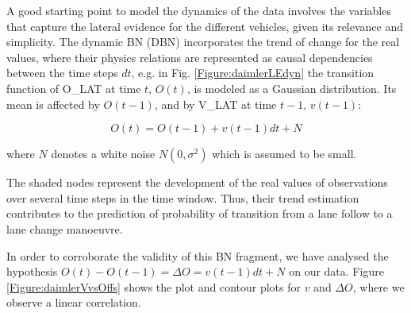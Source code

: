 A good starting point to model the dynamics of the data involves the variables that capture the lateral evidence for the different vehicles, given its relevance and simplicity. 
The dynamic BN (DBN) incorporates the trend of change for the real values, where their physics relations are represented as causal dependencies between the time steps $dt$, e.g. in Fig. \ref{Figure:daimlerLEdyn} the transition function of O\_LAT at time $t$, $O(t)$, is modeled as a Gaussian distribution. Its mean is affected by $O(t-1)$, and by V\_LAT at time $t-1$, $v(t-1)$:

\begin{equation}
O(t) =O(t-1) +v(t-1)dt +N
\end{equation}

where $N$ denotes a white noise $N(0,\sigma^2)$ which is assumed to be small.

The shaded nodes represent the development of the real values of observations over several time steps in the time window. Thus, their trend estimation contributes to the prediction of probability of transition from a lane follow to a lane change manoeuvre.

In order to corroborate the validity of this BN fragment, we have analysed the hypothesis $O(t) - O(t-1) = \Delta O = v(t-1)dt +N$ on our data. Figure \ref{Figure:daimlerVvsOffs} shows the plot and contour plots for $v$ and $\Delta O$, where we observe a linear correlation. 

